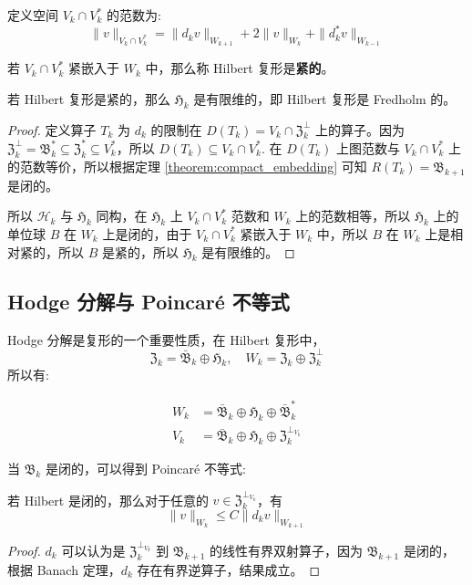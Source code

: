 \documentclass[lang=cn,a4paper,newtx]{elegantpaper}
\begin{document}
定义空间 $V_k \cap V_k^*$ 的范数为:
$$
\|v\|_{V_k\cap V_k^*} = \|d_k v\|_{W_{k+1}} + 2\|v\|_{W_k} + \|d_k^* v\|_{W_{k-1}}
$$

\begin{definition}
    若 $V_k\cap V_k^*$ 紧嵌入于 $W_k$ 中，那么称 Hilbert 复形是\textbf{紧的}。
\end{definition}

\begin{theorem}
    若 Hilbert 复形是紧的，那么 $\mathfrak{H}_k$ 是有限维的，即 Hilbert 复形是 Fredholm 的。
\end{theorem}
\begin{proof}
    定义算子 $T_k$ 为 $d_k$ 的限制在 $D(T_k) = V_k\cap \mathfrak{Z}_k^\perp$
    上的算子。因为 $\mathfrak{Z}_k^{\perp} = \mathfrak{B}_k^{*} \subseteq 
    \mathfrak{Z}_k^{*} \subseteq V_k^*$，所以 $D(T_k) \subseteq V_k \cap V_k^*$.
    在 $D(T_k)$ 上图范数与 $V_k\cap V_k^*$ 上的范数等价，所以根据定理
    \ref{theorem:compact_embedding} 可知 $R(T_k) = \mathfrak{B}_{k+1}$ 是闭的。

    所以 $\mathcal{H}_k$ 与 $\mathfrak{H}_k$ 同构，在 $\mathfrak{H}_k$ 上
    $V_k\cap V_k^*$ 范数和 $W_k$ 上的范数相等，所以 $\mathfrak{H}_k$ 上的单位球
    $B$ 在 $W_k$ 上是闭的，由于 $V_k\cap V_k^*$ 紧嵌入于 $W_k$ 中，所以
    $B$ 在 $W_k$ 上是相对紧的，所以 $B$ 是紧的，所以 $\mathfrak{H}_k$ 是有限维的。
\end{proof}

\subsection{Hodge 分解与 Poincar\'e 不等式}
Hodge 分解是复形的一个重要性质，在 Hilbert 复形中，
$$
\mathfrak{Z}_k = \mathfrak{\bar B}_{k} \oplus \mathfrak{H}_k, \quad
W_k = \mathfrak{Z}_k \oplus \mathfrak{Z}_k^{\perp}
$$
所以有:
\begin{theorem}
$$
\begin{aligned}
W_k & = \mathfrak{\bar B}_{k} \oplus
\mathfrak{H}_k \oplus \mathfrak{\bar B}_{k}^{*}\\
V_k & = \mathfrak{\bar B}_{k} \oplus \mathfrak{H}_k 
\oplus \mathfrak{Z}_{k}^{\perp_{V_k}}
\end{aligned}
$$
\end{theorem}
当 $\mathfrak{B}_k$ 是闭的，可以得到 Poincar\'e 不等式:
\begin{theorem}
    若 Hilbert 是闭的，那么对于任意的 $v \in \mathfrak{Z}_k^{\perp_{V_k}}$，有
    $$
    \|v\|_{W_k} \leq C\|d_k v\|_{W_{k+1}}
    $$
\end{theorem}
\begin{proof}
  $d_k$ 可以认为是 $\mathfrak{Z}_k^{\perp_{V_k}}$ 到 $\mathfrak{B}_{k+1}$
  的线性有界双射算子，因为 $\mathfrak{B}_{k+1}$ 是闭的，
  根据 Banach 定理，$d_k$ 存在有界逆算子，结果成立。
\end{proof}
\end{document}
